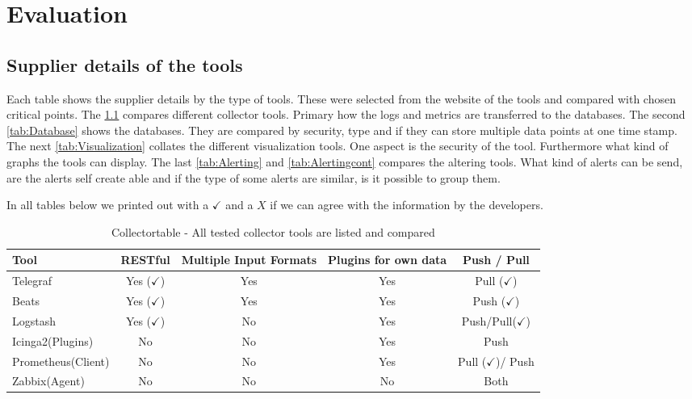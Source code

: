 \chapter{Evaluation} %
\section{Supplier details of the tools}
Each table shows the supplier details by the type of tools. These were selected from the website of the tools and compared with chosen critical points. The \cref{tab:Collector} compares different collector tools. Primary how the logs and metrics are transferred to the databases. The second \cref{tab:Database} shows the databases. They are compared by security, type and if they can store multiple data points at one time stamp. \\
The next \cref{tab:Visualization} collates the different visualization tools. One aspect is the security of the tool. Furthermore what kind of graphs the tools can display. The last \cref{tab:Alerting} and \cref{tab:Alertingcont} compares the altering tools. What kind of alerts can be send, are the alerts self create able and if the type of some alerts are similar, is it possible to group them.

In all tables below we printed out with a $ \checkmark $ and a $ X $ if we can agree with the information by the developers.

   

\begin{table}
\centering
\begin{tabular}{p{3cm}cccc}
\hline
Tool & RESTful  & Multiple Input Formats      & Plugins for own data        & Push / Pull \\
\hline
Telegraf    & Yes ($ \checkmark $) & Yes    & Yes    &Pull    ($ \checkmark $)  \\
Beats  & Yes ($ \checkmark $)  & Yes & Yes  & Push ($ \checkmark $) \\
Logstash & Yes ($ \checkmark $)  & No & Yes & Push/Pull($\checkmark$)                         \\
Icinga2(Plugins)  & No  & No  & Yes  & Push \\
Prometheus(Client)  & No  & No  & Yes  & Pull ($ \checkmark $)/ Push\\
Zabbix(Agent) & No  & No  & No  & Both \\
\hline                        
\end{tabular}

\caption{Collectortable - All tested collector tools are listed and compared}
\label{tab:Collector}

\end{table}


